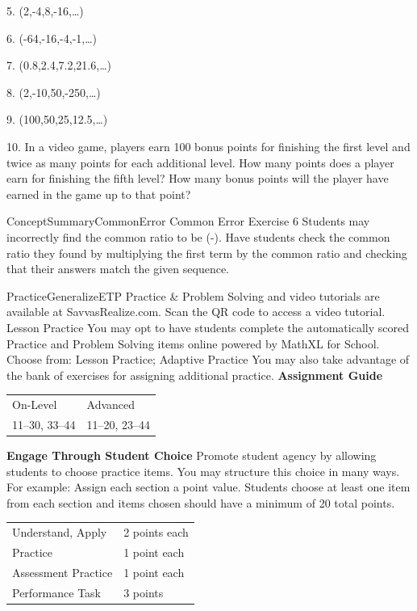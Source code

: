 \documentclass{article}
\newenvironment{concept-summary}{}{}    %
\newenvironment{te-addendum}[2]{}{}     %
\newcommand{\answer}[1]{}               %
\newcommand{\placeholder}[2]{}          %
\newcommand{\te}[1]{}                   %
\begin{document}
\begin{concept-summary}
5. (2,-4,8,-16,\ldots)
\answer{(-2); (32,-64,128)}
6. (-64,-16,-4,-1,\ldots)
\answer{(\frac{1}{4}); (-\frac{1}{4},-\frac{1}{16},-\frac{1}{64})}
7. (0.8,2.4,7.2,21.6,\ldots)
\answer{3; 64.8, 194.4, 583.2}
8. (2,-10,50,-250,\ldots)
\answer{(-5); (1,250,-6,250,31,250)}
9. (100,50,25,12.5,\ldots)
\answer{0.5; 6.25, 3.125, 1.5625}
10. In a video game, players earn 100 bonus points for finishing the first level and twice as many points for each additional level. How many points does a player earn for finishing the fifth level? How many bonus points will the player have earned in the game up to that point?
\answer{1600 points; 3100 points}
\placeholder{illustration}{Handheld video game console with blue screen reading NEW LEVEL Double your points!}
\end{concept-summary}
\begin{te-addendum}{ConceptSummary}{CommonError}
Common Error
Exercise 6 Students may incorrectly find the common ratio to be (-). Have students check the common ratio they found by multiplying the first term by the common ratio and checking that their answers match the given sequence.
\end{te-addendum}
\begin{te-addendum}{Practice}{GeneralizeETP}
Practice & Problem Solving and video tutorials are available at SavvasRealize.com.
Scan the QR code to access a video tutorial.
Lesson Practice You may opt to have students complete the automatically scored Practice and Problem Solving items online powered by MathXL for School.
Choose from: Lesson Practice; Adaptive Practice
You may also take advantage of the bank of exercises for assigning additional practice.
\textbf{Assignment Guide}
\begin{tabular}{ll}
On-Level & Advanced \\
11--30, 33--44 & 11--20, 23--44 \\
\end{tabular}
\textbf{Engage Through Student Choice}
Promote student agency by allowing students to choose practice items. You may structure this choice in many ways.
For example:
Assign each section a point value. Students choose at least one item from each section and items chosen should have a minimum of 20 total points.
\begin{tabular}{ll}
Understand, Apply & 2 points each \\
Practice & 1 point each \\
Assessment Practice & 1 point each \\
Performance Task & 3 points \\
\end{tabular}
\te{Printed Assignment Guide and Item Analysis refer to item 44; the printed practice ends at 43. No item 44 is supplied on these pages.}
\end{te-addendum}
\end{document}
